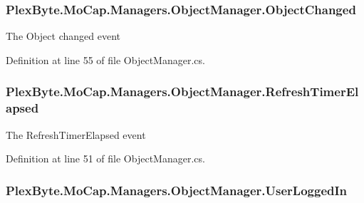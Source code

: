 \subsubsection[{\texorpdfstring{Object\+Changed}{ObjectChanged}}]{ Plex\+Byte.\+Mo\+Cap.\+Managers.\+Object\+Manager.\+Object\+Changed}\hypertarget{class_plex_byte_1_1_mo_cap_1_1_managers_1_1_object_manager_a84f1c6e8b0f7c6e6037c31c4fcfa3b14}{}\label{class_plex_byte_1_1_mo_cap_1_1_managers_1_1_object_manager_a84f1c6e8b0f7c6e6037c31c4fcfa3b14}


The Object changed event 



Definition at line 55 of file Object\+Manager.\+cs.

\subsubsection[{\texorpdfstring{Refresh\+Timer\+Elapsed}{RefreshTimerElapsed}}]{ Plex\+Byte.\+Mo\+Cap.\+Managers.\+Object\+Manager.\+Refresh\+Timer\+Elapsed}\hypertarget{class_plex_byte_1_1_mo_cap_1_1_managers_1_1_object_manager_a3959ab01579b06c6f5e96b36761e6d44}{}\label{class_plex_byte_1_1_mo_cap_1_1_managers_1_1_object_manager_a3959ab01579b06c6f5e96b36761e6d44}


The Refresh\+Timer\+Elapsed event 



Definition at line 51 of file Object\+Manager.\+cs.

\subsubsection[{\texorpdfstring{User\+Logged\+In}{UserLoggedIn}}]{ Plex\+Byte.\+Mo\+Cap.\+Managers.\+Object\+Manager.\+User\+Logged\+In}\hypertarget{class_plex_byte_1_1_mo_cap_1_1_managers_1_1_object_manager_ae5b35db2e937c6f2c6e43b612cde9c18}{}\label{class_plex_byte_1_1_mo_cap_1_1_managers_1_1_object_manager_ae5b35db2e937c6f2c6e43b612cde9c18}


